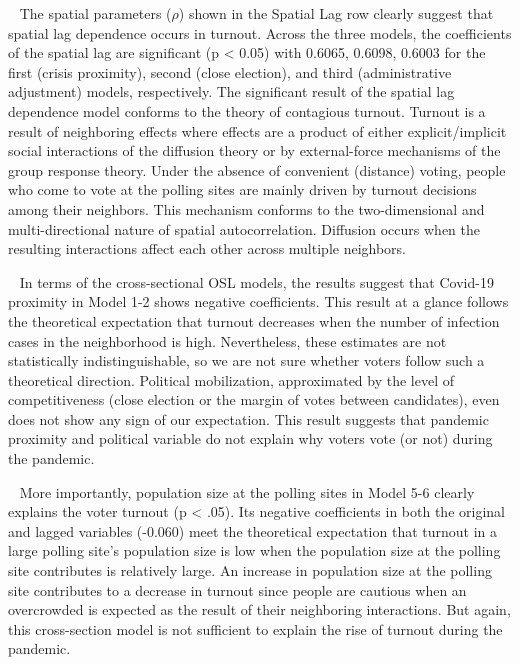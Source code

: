 \documentclass[
  12pt,
]{article}
\begin{document}
~ The spatial parameters (\(\rho\)) shown in the Spatial Lag row clearly
suggest that spatial lag dependence occurs in turnout. Across the three
models, the coefficients of the spatial lag are significant (p
\textless{} 0.05) with 0.6065, 0.6098, 0.6003 for the first (crisis
proximity), second (close election), and third (administrative
adjustment) models, respectively. The significant result of the spatial
lag dependence model conforms to the theory of contagious turnout.
Turnout is a result of neighboring effects where effects are a product
of either explicit/implicit social interactions of the diffusion theory
or by external-force mechanisms of the group response theory. Under the
absence of convenient (distance) voting, people who come to vote at the
polling sites are mainly driven by turnout decisions among their
neighbors. This mechanism conforms to the two-dimensional and
multi-directional nature of spatial autocorrelation. Diffusion occurs
when the resulting interactions affect each other across multiple
neighbors.

~ In terms of the cross-sectional OSL models, the results suggest that
Covid-19 proximity in Model 1-2 shows negative coefficients. This result
at a glance follows the theoretical expectation that turnout decreases
when the number of infection cases in the neighborhood is high.
Nevertheless, these estimates are not statistically indistinguishable,
so we are not sure whether voters follow such a theoretical direction.
Political mobilization, approximated by the level of competitiveness
(close election or the margin of votes between candidates), even does
not show any sign of our expectation. This result suggests that pandemic
proximity and political variable do not explain why voters vote (or not)
during the pandemic.

~ More importantly, population size at the polling sites in Model 5-6
clearly explains the voter turnout (p \textless{} .05). Its negative
coefficients in both the original and lagged variables (-0.060) meet the
theoretical expectation that turnout in a large polling site's
population size is low when the population size at the polling site
contributes is relatively large. An increase in population size at the
polling site contributes to a decrease in turnout since people are
cautious when an overcrowded is expected as the result of their
neighboring interactions. But again, this cross-section model is not
sufficient to explain the rise of turnout during the pandemic.
\end{document}
